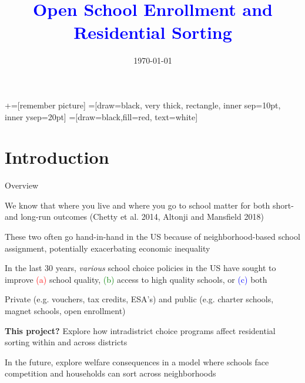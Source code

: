\documentclass[notes,11pt, aspectratio=169]{beamer}
\title[]{\textcolor{blue}{Open School Enrollment and Residential Sorting}}
\author[MCC]{}
\institute[Yale]{\small{\begin{tabular}{c}
Crossan Cooper  \\
Yale University \\
\end{tabular}}}
\date{\today}
\newenvironment{wideitemize}{\itemize\addtolength{\itemsep}{10pt}}{\enditemize}
\begin{document}
\newcommand\marktopleft[1]{%
    \tikz[overlay,remember picture] 
        \node (marker-#1-a) at (-.3em,.3em) {};%
}
\newcommand\markbottomright[2]{%
    \tikz[overlay,remember picture] 
        \node (marker-#1-b) at (0em,0em) {};%
}
+=[remember picture] 
 =[draw=black, very thick, rectangle, inner sep=10pt, inner ysep=20pt]
 =[draw=black,fill=red, text=white]

\begin{frame}
\maketitle
\end{frame}

\section{Introduction}

\begin{frame}{Overview}
\label{mapback}
  \begin{wideitemize}
    \item We know that where you live and where you go to school matter for both short- and long-run outcomes (Chetty et al. 2014, Altonji and Mansfield 2018)
    \item These two often go hand-in-hand in the US because of neighborhood-based school assignment, potentially exacerbating economic inequality
    \item In the last 30 years, \textit{various} school choice policies in the US have sought to improve \textcolor{red}{(a)} school quality, \textcolor{green}{(b)} access to high quality schools, or \textcolor{blue}{(c)} both
    \begin{wideitemize}
    \item Private (e.g. vouchers, tax credits, ESA's) and public (e.g. charter schools, magnet schools, open enrollment)
    \end{wideitemize}
    \item \textbf{This project?} Explore how intradistrict choice programs affect residential sorting within and across districts
    \begin{wideitemize}
    \item In the future, explore welfare consequences in a model where schools face competition and households can sort across neighborhoods
    \end{wideitemize}
  \end{wideitemize}
  \hyperlink{map}{}
\end{frame}
\end{document}
